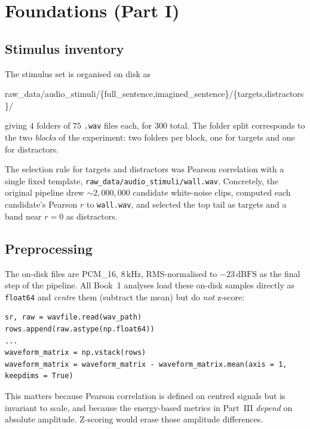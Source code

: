 \documentclass[11pt]{article}
\begin{document}
\section{Foundations (Part I)}

\subsection{Stimulus inventory}
\label{sec:inventory}

The stimulus set is organised on disk as
\begin{center}
\ttfamily
raw\_data/audio\_stimuli/\{full\_sentence,imagined\_sentence\}/\{targets,distractors\}/
\end{center}
giving $4$ folders of $75$ \texttt{.wav} files each, for $300$ total.  The
folder split corresponds to the two \emph{blocks} of the experiment:
two folders per block, one for targets and one for distractors.

The selection rule for targets and distractors was Pearson correlation
with a single fixed template, \texttt{raw\_data/audio\_stimuli/wall.wav}.
Concretely, the original pipeline drew $\sim 2{,}000{,}000$ candidate
white-noise clips, computed each candidate's Pearson $r$ to
\texttt{wall.wav}, and selected the top tail as targets and a band near
$r = 0$ as distractors.

\subsection{Preprocessing}

The on-disk files are PCM\_16, $8\,\mathrm{kHz}$, RMS-normalised to
$-23\,\mathrm{dBFS}$ as the final step of the pipeline.  All Book~1
analyses load these on-disk samples directly as \texttt{float64} and
\emph{centre} them (subtract the mean) but do \emph{not} z-score:

\begin{lstlisting}[caption={Canonical loader (excerpt from \texttt{ch11-non-pearson-metrics.py})}]
sr, raw = wavfile.read(wav_path)
rows.append(raw.astype(np.float64))
...
waveform_matrix = np.vstack(rows)
waveform_matrix = waveform_matrix - waveform_matrix.mean(axis = 1, keepdims = True)
\end{lstlisting}

This matters because Pearson correlation is defined on centred signals
but is invariant to scale, and because the energy-based metrics in
Part~III \emph{depend} on absolute amplitude.  Z-scoring would erase
those amplitude differences.
\end{document}
